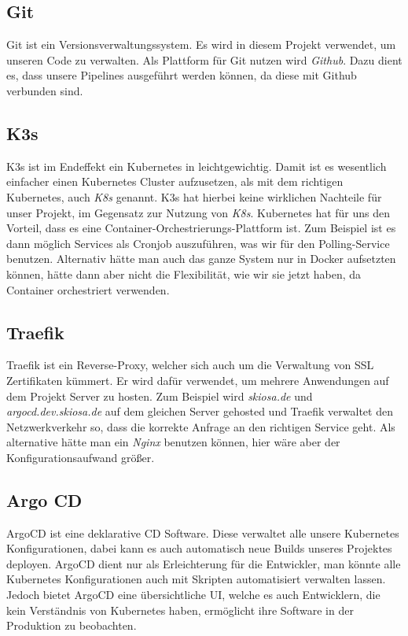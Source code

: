 \subsection{Git}
    Git ist ein Versionsverwaltungssystem. Es wird in diesem Projekt verwendet, um unseren Code zu verwalten. Als Plattform für Git nutzen wird \textit{Github}.
    Dazu dient es, dass unsere Pipelines ausgeführt werden können, da diese mit Github verbunden sind.
\subsection{K3s}
    K3s ist im Endeffekt ein Kubernetes in leichtgewichtig. Damit ist es wesentlich einfacher einen Kubernetes Cluster aufzusetzen, als mit dem richtigen Kubernetes, auch \textit{K8s} genannt.
    K3s hat hierbei keine wirklichen Nachteile für unser Projekt, im Gegensatz zur Nutzung von \textit{K8s}. Kubernetes hat für uns den Vorteil, dass es eine Container-Orchestrierungs-Plattform ist.
    Zum Beispiel ist es dann möglich Services als Cronjob auszuführen, was wir für den Polling-Service benutzen. Alternativ hätte man auch das ganze System nur in Docker aufsetzten können, hätte dann aber 
    nicht die Flexibilität, wie wir sie jetzt haben, da Container orchestriert verwenden.
\subsection{Traefik}
    Traefik ist ein Reverse-Proxy, welcher sich auch um die Verwaltung von \ac{SSL} Zertifikaten kümmert. Er wird dafür verwendet, um mehrere Anwendungen auf dem Projekt Server zu hosten.
    Zum Beispiel wird \textit{skiosa.de} und \textit{argocd.dev.skiosa.de} auf dem gleichen Server gehosted und Traefik verwaltet den Netzwerkverkehr so, dass die korrekte Anfrage an den richtigen Service geht.
    Als alternative hätte man ein \textit{Nginx} benutzen können, hier wäre aber der Konfigurationsaufwand größer.
\subsection{Argo CD}
    ArgoCD ist eine deklarative \ac{CD} Software. Diese verwaltet alle unsere Kubernetes Konfigurationen, dabei kann es auch automatisch neue Builds unseres Projektes deployen.
    ArgoCD dient nur als Erleichterung für die Entwickler, man könnte alle Kubernetes Konfigurationen auch mit Skripten automatisiert verwalten lassen. Jedoch bietet ArgoCD eine übersichtliche UI,
    welche es auch Entwicklern, die kein Verständnis von Kubernetes haben, ermöglicht ihre Software in der Produktion zu beobachten.
